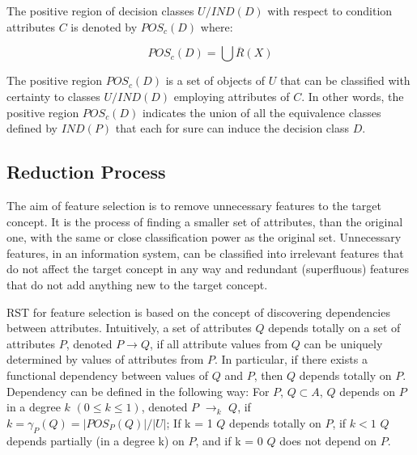 \documentclass{llncs}
\begin{document}
The positive region of decision classes $U/IND(D)$ with respect to condition attributes $C$ is denoted by $POS_c(D)$ where:

\begin{displaymath}
POS_c(D) = \bigcup \overline{R}(X)
\end{displaymath}

The positive region $POS_c(D)$ is a set of objects  of $U$ that can be classified with certainty to classes $U/IND(D)$ employing attributes of $C$. In other words, the positive region $POS_c(D)$ indicates the union of all the equivalence classes defined by $IND(P)$ that each for sure can induce the decision class $D$.

\subsection{Reduction Process}
\label{subsec:quickreduct}

The aim of feature selection is to remove unnecessary features to the target concept. It is the process of finding a smaller set of attributes, than the original one, with the same or close classification power as the original set. Unnecessary features, in an information system, can be classified into irrelevant features  that do not affect the target concept in any way  and redundant (superfluous) features that do not add anything new to the target concept.

RST for feature selection is based on the concept of  discovering dependencies between attributes. Intuitively, a set of attributes $Q$ depends totally on a set of attributes $P$, denoted $P \rightarrow Q$, if all attribute values from $Q$ can be uniquely determined by values of attributes from $P$. In particular, if there exists a functional dependency between values of $Q$ and $P$, then $Q$ depends totally on $P$. Dependency can be defined in the following way: For $P$, $Q  \subset A$, $Q$  depends on $P$ in a degree $k$ $(0 \leq k \leq 1)$,  denoted $P$ $\rightarrow_{k}$ $Q$, if $k = \gamma_{P}(Q) = |POS_{P}(Q)|/|U|$;  If k = 1 $Q$ depends totally on $P$, if $k < 1 $  $Q$ depends partially (in a degree k) on $P$, and if k = 0 $Q$ does not depend on $P$.
\end{document}

